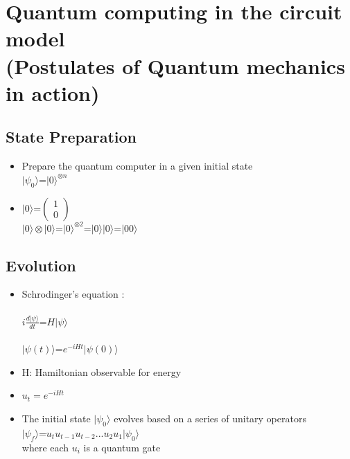 \documentclass{article}
\begin{document}
\section{Quantum computing in the circuit model\\ (Postulates of Quantum mechanics in action)}
\subsection{State Preparation}
\begin{itemize}
	\item Prepare the quantum computer in a given initial state\\
	      ${|\psi_{0}}\rangle$=${|0\rangle^{\otimes n}}$
\end{itemize}\begin{itemize}
	\item ${|0\rangle}$=${\begin{pmatrix}
					      1 \\
					      0
				      \end{pmatrix}}$\\
	      ${|0\rangle\otimes|0\rangle}$=${|0\rangle^{\otimes2}}$=${|0\rangle|0\rangle}$=${|00\rangle}$
\end{itemize}

\subsection{Evolution}
\begin{itemize}
	\item Schrodinger's equation :\\\\
	      ${i\frac{d|\psi\rangle}{dt}}$=${H|\psi\rangle}$\\\\
	      ${|\psi(t)\rangle}$=${e^{-iHt}}|\psi(0)\rangle$
\end{itemize}
\begin{itemize}
	\item H: Hamiltonian observable for energy
\end{itemize}
\begin{itemize}
	\item ${u_t} = {e^{-iHt}}$
\end{itemize}
\begin{itemize}
	\item The initial state ${|\psi_0\rangle}$ evolves based on a series of unitary operators  \\
	      ${|\psi_f\rangle}$=${u_tu_{t-1}u_{t-2}...u_2u_1|\psi_0\rangle}$\\
	      where each ${u_i}$ is a quantum gate
\end{itemize}
\end{document}
